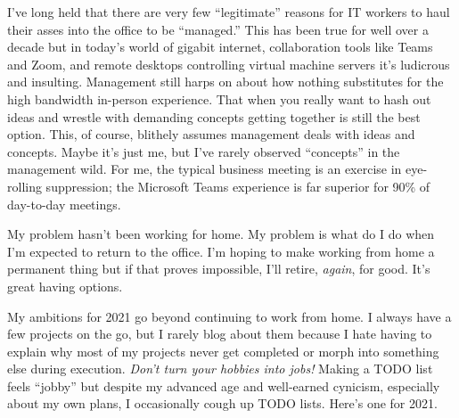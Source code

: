 I've long held that there are very few ``legitimate'' reasons for
IT workers to haul their asses into the office to be ``managed.'' This
has been true for well over a decade but in today's world of gigabit
internet, collaboration tools like Teams and Zoom, and remote desktops
controlling virtual machine servers it's ludicrous and insulting.
Management still harps on about how nothing substitutes for the high
bandwidth in-person experience. That when you really want to hash out
ideas and wrestle with demanding concepts getting together is still the
best option. This, of course, blithely assumes management deals with
ideas and concepts. Maybe it's just me, but I've rarely observed
``concepts'' in the management wild. For me, the typical business
meeting is an exercise in eye-rolling suppression; the Microsoft Teams
experience is far superior for 90\% of day-to-day meetings.

My problem hasn't been working for home. My problem is what do I do when
I'm expected to return to the office. I'm hoping to make working from
home a permanent thing but if that proves impossible, I'll retire,
\emph{again}, for good. It's great having options.

My ambitions for 2021 go beyond continuing to work from home. I always
have a few projects on the go, but I rarely blog about them because I
hate having to explain why most of my projects never get completed or
morph into something else during execution. \emph{Don't turn your
hobbies into jobs!} Making a TODO list feels ``jobby'' but despite my
advanced age and well-earned cynicism, especially about my own plans, I
occasionally cough up TODO lists. Here's one for 2021.

